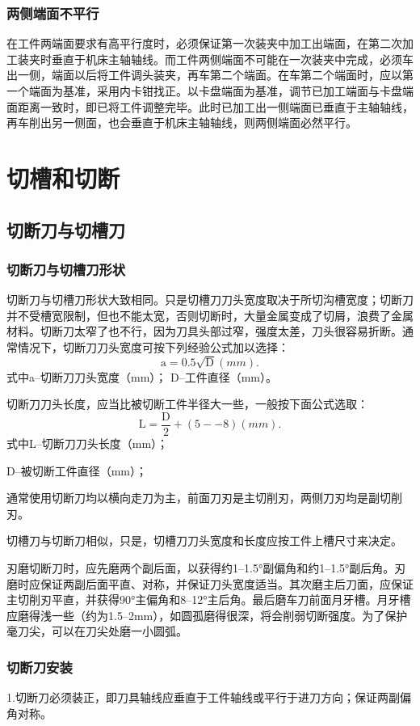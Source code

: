 \documentclass{ctexbook}
\begin{document}
\subsubsection{两侧端面不平行}
在工件两端面要求有高平行度时，必须保证第一次装夹中加工出端面，在第二次加工装夹时垂直于机床主轴轴线。而工件两侧端面不可能在一次装夹中完成，必须车出一侧，端面以后将工件调头装夹，再车第二个端面。在车第二个端面时，应以第一个端面为基准，采用内卡钳找正。以卡盘端面为基准，调节已加工端面与卡盘端面距离一致时，即已将工件调整完毕。此时已加工出一侧端面已垂直于主轴轴线，再车削出另一侧面，也会垂直于机床主轴轴线，则两侧端面必然平行。
\section{切槽和切断}
\subsection{切断刀与切槽刀}
\subsubsection{切断刀与切槽刀形状}
切断刀与切槽刀形状大致相同。只是切槽刀刀头宽度取决于所切沟槽宽度；切断刀并不受槽宽限制，但也不能太宽，否则切断时，大量金属变成了切屑，浪费了金属材料。切断刀太窄了也不行，因为刀具头部过窄，强度太差，刀头很容易折断。通常情况下，切断刀刀头宽度可按下列经验公式加以选择：
\begin{equation*}
	\text{a}=0.5\sqrt{\text{D}} (mm).
\end{equation*}
式中a--切断刀刀头宽度（mm）；
D--工件直径（mm）。

切断刀刀头长度，应当比被切断工件半径大一些，一般按下面公式选取：
\begin{equation*}
	\text{L}=\frac{\text{D}}{2}+(5--8) (mm) .
\end{equation*}
式中L--切断刀刀头长度（mm）；

D--被切断工件直径（mm）；

通常使用切断刀均以横向走刀为主，前面刀刃是主切削刃，两侧刀刃均是副切削刃。

切槽刀与切断刀相似，只是，切槽刀刀头宽度和长度应按工件上槽尺寸来决定。

刃磨切断刀时，应先磨两个副后面，以获得约1--1.5°副偏角和约1--1.5°副后角。刃磨时应保证两副后面平直、对称，并保证刀头宽度适当。其次磨主后刀面，应保证主切削刃平直，并获得90°主偏角和8--12°主后角。最后磨车刀前面月牙槽。月牙槽应磨得浅一些（约为1.5--2mm），如圆孤磨得很深，将会削弱切断强度。为了保护毫刀尖，可以在刀尖处磨一小圆弧。
\subsubsection{切断刀安装}
1.切断刀必须装正，即刀具轴线应垂直于工件轴线或平行于进刀方向；保证两副偏角对称。
\end{document}
